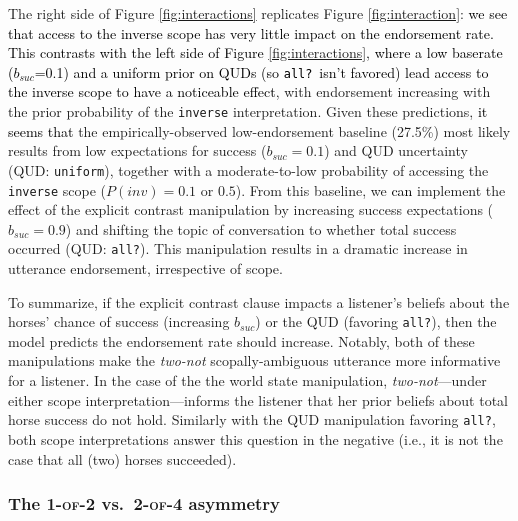 \documentclass[cm]{glossa}
\newcommand{\lp}[1]{\textcolor{black}{#1}} %
\begin{document}
The right side of Figure 
\ref{fig:interactions} replicates Figure \ref{fig:interaction}: 
\lp{we see that access to the inverse scope has very little impact on the endorsement rate.}
\lp{This contrasts with the left side of Figure \ref{fig:interactions},
 where a low baserate ($b_{suc}$=0.1) and a uniform prior on QUDs (so \texttt{all?}~isn't favored) lead 
access to the inverse scope to have a noticeable effect}, with endorsement increasing with the prior probability of the \texttt{inverse} interpretation. 
Given these predictions, \lp{it seems that} the empirically-observed low-endorsement baseline (27.5\%) most likely results from low expectations for success ($b_{suc}=0.1$) and QUD uncertainty (QUD: \texttt{uniform}), together with a moderate-to-low probability of accessing the \texttt{inverse} scope ($P(inv)=0.1$ or $0.5$). From this baseline, we \lp{can} implement the effect of the explicit contrast manipulation by increasing success expectations ($b_{suc}=0.9$) and shifting the topic of conversation to whether total success occurred (QUD: \texttt{all?}). This manipulation results in a dramatic increase in utterance endorsement, irrespective of scope. 

To summarize, if the explicit contrast clause impacts a listener's beliefs about the horses' chance of success (increasing $b_{suc}$) or the QUD (favoring \texttt{all?}), then the model predicts the endorsement rate should increase. Notably, both of these manipulations make the \emph{two-not} scopally-ambiguous utterance more informative for a listener. In the case of the the world state manipulation, \emph{two-not}---under either scope interpretation---informs the listener that her prior beliefs about total horse success do not hold. Similarly with the QUD manipulation favoring \texttt{all?}, both scope interpretations answer this question in the negative (i.e., it is not the case that all (two) horses succeeded). 


\subsubsection{The \textsc{1-of-2} vs.~\textsc{2-of-4} asymmetry}
\end{document}
